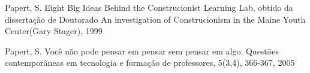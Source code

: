 \documentclass[
12pt,		%
openright,	%
twoside,  %
a4paper,			%
chapter=TITLE,		%
english,			%
french,				%
spanish,			%
brazil				%
]{USPSC-classe/USPSC}
\begin{document}
\begin{flushleft}
\begin{flushleft}
\begin{flushleft}
\begin{flushleft}
\begin{flushleft}
\begin{flushleft}
\begin{flushleft}
\begin{flushleft}
\begin{flushleft}
[PAPERT, 1999] Papert, S. Eight Big Ideas Behind the Construcionist Learning Lab, obtido da disserta\c{c}\~ao de Doutorado \textquotedbl An investigation of Construcionism in the Maine Youth Center\textquotedbl  (Gary Stager), 1999
\end{flushleft}


\end{flushleft}


\end{flushleft}


\end{flushleft}


\end{flushleft}


\end{flushleft}


\end{flushleft}


\end{flushleft}


\end{flushleft}


\begin{flushleft}
\begin{flushleft}
\begin{flushleft}
\begin{flushleft}
\begin{flushleft}
\begin{flushleft}
\begin{flushleft}
\begin{flushleft}
\begin{flushleft}
[PAPERT, 2005a] Papert, S. Voc\^e n\~ao pode pensar em pensar sem pensar em algo. Quest\~oes contempor\^aneas em tecnologia e forma\c{c}\~ao de professores, 5(3,4), 366-367, 2005
\end{flushleft}


\end{flushleft}


\end{flushleft}


\end{flushleft}


\end{flushleft}


\end{flushleft}


\end{flushleft}


\end{flushleft}


\end{flushleft}
\end{document}
